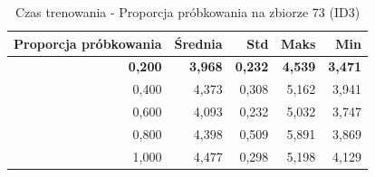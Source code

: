 \begin{table}[htbp]
\centering
\small
\setlength{\tabcolsep}{6pt}
\renewcommand{\arraystretch}{1.2}
\caption{Czas trenowania - Proporcja próbkowania na zbiorze 73 (ID3)}
\label{tab:ID3_sample_ratio_73_time}
\begin{tabular}{r|r|r|r|r}
\toprule
Proporcja próbkowania & Średnia & Std & Maks & Min \\
\hline
\textbf{0,200} & \textbf{3,968} & \textbf{0,232} & \textbf{4,539} & \textbf{3,471} \\
0,400 & 4,373 & 0,308 & 5,162 & 3,941 \\
0,600 & 4,093 & 0,232 & 5,032 & 3,747 \\
0,800 & 4,398 & 0,509 & 5,891 & 3,869 \\
1,000 & 4,477 & 0,298 & 5,198 & 4,129 \\
\bottomrule
\end{tabular}
\end{table}
